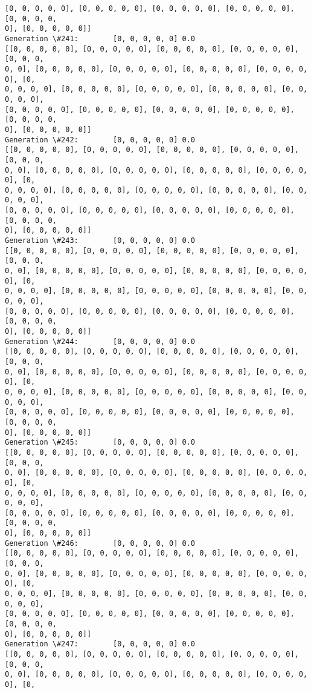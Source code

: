 \documentclass[11pt]{article}
\begin{document}
\begin{Verbatim}[commandchars=\\\{\}]
[0, 0, 0, 0, 0], [0, 0, 0, 0, 0], [0, 0, 0, 0, 0], [0, 0, 0, 0, 0], [0, 0, 0, 0,
0], [0, 0, 0, 0, 0]]
Generation \#241:        [0, 0, 0, 0, 0] 0.0
[[0, 0, 0, 0, 0], [0, 0, 0, 0, 0], [0, 0, 0, 0, 0], [0, 0, 0, 0, 0], [0, 0, 0,
0, 0], [0, 0, 0, 0, 0], [0, 0, 0, 0, 0], [0, 0, 0, 0, 0], [0, 0, 0, 0, 0], [0,
0, 0, 0, 0], [0, 0, 0, 0, 0], [0, 0, 0, 0, 0], [0, 0, 0, 0, 0], [0, 0, 0, 0, 0],
[0, 0, 0, 0, 0], [0, 0, 0, 0, 0], [0, 0, 0, 0, 0], [0, 0, 0, 0, 0], [0, 0, 0, 0,
0], [0, 0, 0, 0, 0]]
Generation \#242:        [0, 0, 0, 0, 0] 0.0
[[0, 0, 0, 0, 0], [0, 0, 0, 0, 0], [0, 0, 0, 0, 0], [0, 0, 0, 0, 0], [0, 0, 0,
0, 0], [0, 0, 0, 0, 0], [0, 0, 0, 0, 0], [0, 0, 0, 0, 0], [0, 0, 0, 0, 0], [0,
0, 0, 0, 0], [0, 0, 0, 0, 0], [0, 0, 0, 0, 0], [0, 0, 0, 0, 0], [0, 0, 0, 0, 0],
[0, 0, 0, 0, 0], [0, 0, 0, 0, 0], [0, 0, 0, 0, 0], [0, 0, 0, 0, 0], [0, 0, 0, 0,
0], [0, 0, 0, 0, 0]]
Generation \#243:        [0, 0, 0, 0, 0] 0.0
[[0, 0, 0, 0, 0], [0, 0, 0, 0, 0], [0, 0, 0, 0, 0], [0, 0, 0, 0, 0], [0, 0, 0,
0, 0], [0, 0, 0, 0, 0], [0, 0, 0, 0, 0], [0, 0, 0, 0, 0], [0, 0, 0, 0, 0], [0,
0, 0, 0, 0], [0, 0, 0, 0, 0], [0, 0, 0, 0, 0], [0, 0, 0, 0, 0], [0, 0, 0, 0, 0],
[0, 0, 0, 0, 0], [0, 0, 0, 0, 0], [0, 0, 0, 0, 0], [0, 0, 0, 0, 0], [0, 0, 0, 0,
0], [0, 0, 0, 0, 0]]
Generation \#244:        [0, 0, 0, 0, 0] 0.0
[[0, 0, 0, 0, 0], [0, 0, 0, 0, 0], [0, 0, 0, 0, 0], [0, 0, 0, 0, 0], [0, 0, 0,
0, 0], [0, 0, 0, 0, 0], [0, 0, 0, 0, 0], [0, 0, 0, 0, 0], [0, 0, 0, 0, 0], [0,
0, 0, 0, 0], [0, 0, 0, 0, 0], [0, 0, 0, 0, 0], [0, 0, 0, 0, 0], [0, 0, 0, 0, 0],
[0, 0, 0, 0, 0], [0, 0, 0, 0, 0], [0, 0, 0, 0, 0], [0, 0, 0, 0, 0], [0, 0, 0, 0,
0], [0, 0, 0, 0, 0]]
Generation \#245:        [0, 0, 0, 0, 0] 0.0
[[0, 0, 0, 0, 0], [0, 0, 0, 0, 0], [0, 0, 0, 0, 0], [0, 0, 0, 0, 0], [0, 0, 0,
0, 0], [0, 0, 0, 0, 0], [0, 0, 0, 0, 0], [0, 0, 0, 0, 0], [0, 0, 0, 0, 0], [0,
0, 0, 0, 0], [0, 0, 0, 0, 0], [0, 0, 0, 0, 0], [0, 0, 0, 0, 0], [0, 0, 0, 0, 0],
[0, 0, 0, 0, 0], [0, 0, 0, 0, 0], [0, 0, 0, 0, 0], [0, 0, 0, 0, 0], [0, 0, 0, 0,
0], [0, 0, 0, 0, 0]]
Generation \#246:        [0, 0, 0, 0, 0] 0.0
[[0, 0, 0, 0, 0], [0, 0, 0, 0, 0], [0, 0, 0, 0, 0], [0, 0, 0, 0, 0], [0, 0, 0,
0, 0], [0, 0, 0, 0, 0], [0, 0, 0, 0, 0], [0, 0, 0, 0, 0], [0, 0, 0, 0, 0], [0,
0, 0, 0, 0], [0, 0, 0, 0, 0], [0, 0, 0, 0, 0], [0, 0, 0, 0, 0], [0, 0, 0, 0, 0],
[0, 0, 0, 0, 0], [0, 0, 0, 0, 0], [0, 0, 0, 0, 0], [0, 0, 0, 0, 0], [0, 0, 0, 0,
0], [0, 0, 0, 0, 0]]
Generation \#247:        [0, 0, 0, 0, 0] 0.0
[[0, 0, 0, 0, 0], [0, 0, 0, 0, 0], [0, 0, 0, 0, 0], [0, 0, 0, 0, 0], [0, 0, 0,
0, 0], [0, 0, 0, 0, 0], [0, 0, 0, 0, 0], [0, 0, 0, 0, 0], [0, 0, 0, 0, 0], [0,

\end{Verbatim}
\end{document}
